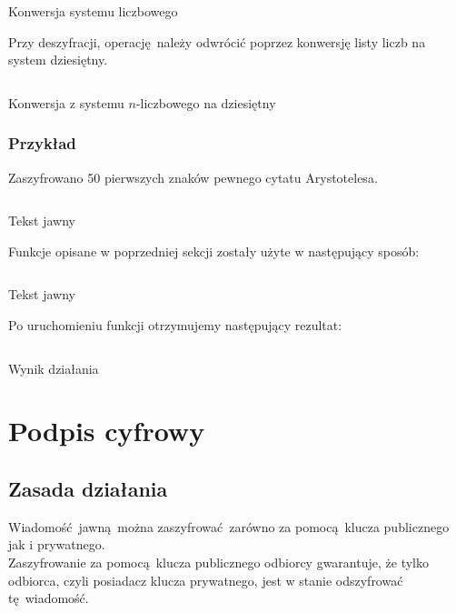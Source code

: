 \documentclass[12pt]{article}
\begin{document}
\begin{listing}[H]
	\inputminted[firstline=7,lastline=17]{python}{../rsa.py}
	\caption{Konwersja systemu liczbowego}
\end{listing}

Przy deszyfracji, operację należy odwrócić poprzez konwersję listy
liczb na system dziesiętny.

\begin{listing}[H]
	\inputminted[firstline=19,lastline=26]{python}{../rsa.py}
	\caption{Konwersja z systemu $n$-liczbowego na dziesiętny}
\end{listing}

\subsubsection{Przykład}

Zaszyfrowano 50 pierwszych znaków pewnego cytatu Arystotelesa.

\begin{listing}[H]
	\inputminted[firstline=12,lastline=15]{python}{../aes_tests.py}
	\caption{Tekst jawny}
\end{listing}

Funkcje opisane w poprzedniej sekcji zostały użyte w następujący sposób:

\begin{listing}[H]
	\inputminted[firstline=54,lastline=59]{python}{../cli.py}
	\caption{Tekst jawny}
\end{listing}

Po uruchomieniu funkcji otrzymujemy następujący rezultat:

\begin{listing}[H]
	\inputminted{yaml}{3-rsa-enc-test.txt}
	\caption{Wynik działania}
\end{listing}

\newpage

\section{Podpis cyfrowy}

\subsection{Zasada działania}

Wiadomość jawną można zaszyfrować zarówno za pomocą klucza publicznego
jak i prywatnego.
\\

Zaszyfrowanie za pomocą klucza publicznego odbiorcy gwarantuje,
że tylko odbiorca, czyli posiadacz klucza prywatnego,
jest w stanie odszyfrować tę wiadomość.
\\
\end{document}

